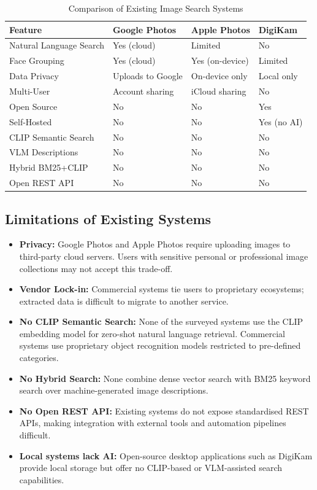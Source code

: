 \documentclass[12pt,a4paper,oneside]{report}
\begin{document}
\begin{table}[H]
\centering\small
\caption{Comparison of Existing Image Search Systems}
\label{tab:existing-systems}
\renewcommand{\arraystretch}{1.4}
\begin{tabular}{|p{3.2cm}|p{3.3cm}|p{3.2cm}|p{3.0cm}|}
\hline
\textbf{Feature} & \textbf{Google Photos} & \textbf{Apple Photos} & \textbf{DigiKam} \\
\hline
Natural Language Search & Yes (cloud) & Limited & No \\
\hline
Face Grouping & Yes (cloud) & Yes (on-device) & Limited \\
\hline
Data Privacy & Uploads to Google & On-device only & Local only \\
\hline
Multi-User & Account sharing & iCloud sharing & No \\
\hline
Open Source & No & No & Yes \\
\hline
Self-Hosted & No & No & Yes (no AI) \\
\hline
CLIP Semantic Search & No & No & No \\
\hline
VLM Descriptions & No & No & No \\
\hline
Hybrid BM25+CLIP & No & No & No \\
\hline
Open REST API & No & No & No \\
\hline
\end{tabular}
\end{table}

\subsection{Limitations of Existing Systems}
\begin{itemize}[leftmargin=*]
  \item \textbf{Privacy:} Google Photos and Apple Photos require uploading
        images to third-party cloud servers. Users with sensitive personal
        or professional image collections may not accept this trade-off.
  \item \textbf{Vendor Lock-in:} Commercial systems tie users to proprietary
        ecosystems; extracted data is difficult to migrate to another service.
  \item \textbf{No CLIP Semantic Search:} None of the surveyed systems use
        the CLIP embedding model for zero-shot natural language retrieval.
        Commercial systems use proprietary object recognition models restricted
        to pre-defined categories.
  \item \textbf{No Hybrid Search:} None combine dense vector search with
        BM25 keyword search over machine-generated image descriptions.
  \item \textbf{No Open REST API:} Existing systems do not expose
        standardised REST APIs, making integration with external tools
        and automation pipelines difficult.
  \item \textbf{Local systems lack AI:} Open-source desktop applications
        such as DigiKam provide local storage but offer no CLIP-based
        or VLM-assisted search capabilities.
\end{itemize}
\end{document}
